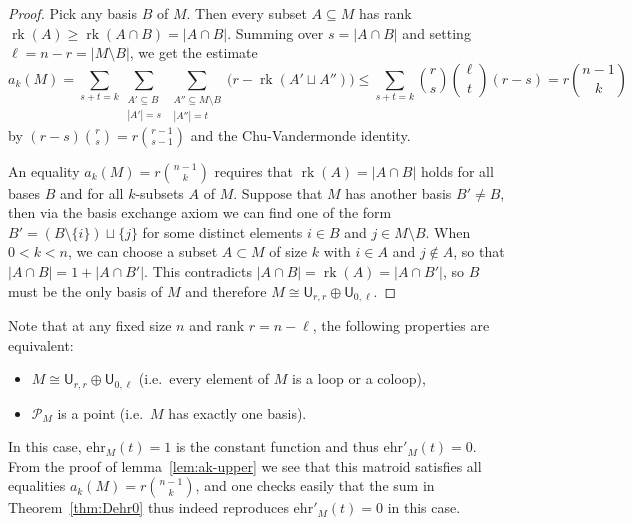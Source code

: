 \documentclass[pagesize,paper=A4,11pt,bibliography=totoc,oneside]{scrartcl}
\newcommand{\abs}[1]{\left|#1\right|}
\DeclareMathOperator{\rk}{rk}
\newcommand{\UM}[2]{\mathsf{U}_{#2,#1}} %
\newcommand{\MP}[1]{\mathscr{P}_{#1}} %
\newcommand{\ehr}{\mathrm{ehr}}
\begin{document}
\begin{proof}
    Pick any basis $B$ of $M$. Then every subset $A\subseteq M$ has rank $\rk(A)\geq \rk(A\cap B)=\abs{A\cap B}$. Summing over $s=\abs{A\cap B}$ and setting $\ell=n-r=\abs{M\setminus B}$, we get the estimate
    \begin{equation*}
        a_k(M)=\sum_{s+t=k} \sum_{\substack{A'\subseteq B \\ \abs{A'}=s}} \sum_{\substack{A''\subseteq M\setminus B \\ \abs{A''}=t}} \Big(r-\rk(A'\sqcup A'')\Big)
        \leq \sum_{s+t=k} \binom{r}{s} \binom{\ell}{t} (r-s)
        =r\binom{n-1}{k}
    \end{equation*}
    by $(r-s)\binom{r}{s}=r\binom{r-1}{s-1}$ and the Chu-Vandermonde identity.
    
    An equality $a_k(M)=r\binom{n-1}{k}$ requires that $\rk(A)=\abs{A\cap B}$ holds for all bases $B$ and for all $k$-subsets $A$ of $M$. Suppose that $M$ has another basis $B'\neq B$, then via the basis exchange axiom we can find one of the form $B'=(B\setminus \{i\})\sqcup \{j\}$ for some distinct elements $i\in B$ and $j\in M\setminus B$. When $0<k<n$, we can choose a subset $A\subset M$ of size $k$ with $i\in A$ and $j\notin A$, so that $\abs{A\cap B}=1+\abs{A\cap B'}$. This contradicts $\abs{A\cap B}=\rk(A)=\abs{A\cap B'}$, so $B$ must be the only basis of $M$ and therefore $M\cong\UM{r}{r}\oplus\UM{\ell}{0}$.
\end{proof}
Note that at any fixed size $n$ and rank $r=n-\ell$, the following properties are equivalent:
\begin{itemize}
    \item $M\cong \UM{r}{r}\oplus \UM{\ell}{0}$ (i.e.\ every element of $M$ is a loop or a coloop),
    \item $\MP{M}$ is a point (i.e.\ $M$ has exactly one basis).
\end{itemize}
In this case, $\ehr_M(t)=1$ is the constant function and thus $\ehr'_M(t)=0$. From the proof of lemma~\ref{lem:ak-upper} we see that this matroid satisfies all equalities $a_k(M)=r\binom{n-1}{k}$, and one checks easily that the sum in Theorem~\ref{thm:Dehr0} thus indeed reproduces $\ehr'_M(t)=0$ in this case.
\end{document}
